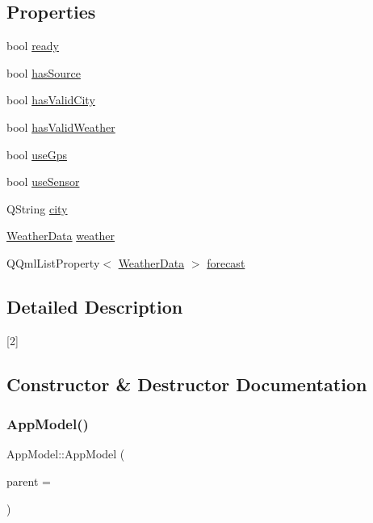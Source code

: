 \subsection*{Properties}
\begin{DoxyCompactItemize}
\item 
bool \hyperlink{class_app_model_a2af4f584bf701bff4546e889c16316d7}{ready}
\item 
bool \hyperlink{class_app_model_a2d25ce9151aea6a45cae797756a84445}{has\+Source}
\item 
bool \hyperlink{class_app_model_a98845ef5ffa3d9db0ee22aa3534b8608}{has\+Valid\+City}
\item 
bool \hyperlink{class_app_model_a493654987603c091935810e34e6b5c05}{has\+Valid\+Weather}
\item 
bool \hyperlink{class_app_model_aac827e2dce65eb299d4eec5ff4ab2155}{use\+Gps}
\item 
bool \hyperlink{class_app_model_ada296063fe2916580f532b639a546851}{use\+Sensor}
\item 
Q\+String \hyperlink{class_app_model_aa6915cabdaaf04805e00b5a2f75311e8}{city}
\item 
\hyperlink{class_weather_data}{Weather\+Data} \hyperlink{class_app_model_a72dfc16433c4ca50da689205e9db9298}{weather}
\item 
Q\+Qml\+List\+Property$<$ \hyperlink{class_weather_data}{Weather\+Data} $>$ \hyperlink{class_app_model_a3e45f56df91b1ad6d27c02c4ab1ad3c3}{forecast}
\end{DoxyCompactItemize}


\subsection{Detailed Description}
\mbox{[}2\mbox{]} 

\subsection{Constructor \& Destructor Documentation}
\mbox{\label{class_app_model_affb3ea459bceb0650cdc810f3f5a2256}} 
\subsubsection{\texorpdfstring{App\+Model()}{AppModel()}}
{\footnotesize\ttfamily App\+Model\+::\+App\+Model (\begin{DoxyParamCaption}\item[{Q\+Object $\ast$}]{parent = {} }\end{DoxyParamCaption})\hspace{0.3cm}{\ttfamily [explicit]}}



